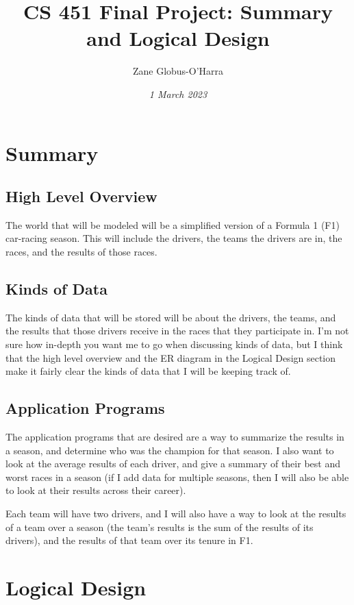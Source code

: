\documentclass{article} %
\title{CS 451 Final Project: Summary and Logical Design}
\author{Zane Globus-O'Harra}
\date{\textit{1 March 2023}}
\begin{document}
\maketitle

\section{Summary}

\subsection{High Level Overview}
The world that will be modeled will be a simplified version of a Formula
1 (F1) car-racing season. This will include the drivers, the teams the
drivers are in, the races, and the results of those races. 

\subsection{Kinds of Data}
The kinds of data that will be stored will be about the drivers, the
teams, and the results that those drivers receive in the races that they
participate in. I'm not sure how in-depth you want me to go when
discussing kinds of data, but I think that the high level overview and
the ER diagram in the Logical Design section make it fairly clear the
kinds of data that I will be keeping track of. 

\subsection{Application Programs}
The application programs that are desired are a way to summarize the
results in a season, and determine who was the champion for that season.
I also want to look at the average results of each driver, and give a
summary of their best and worst races in a season (if I add data for
multiple seasons, then I will also be able to look at their results
across their career).

Each team will have two drivers, and I will also have a way to look at
the results of a team over a season (the team's results is the sum of
the results of its drivers), and the results of that team over its
tenure in F1.


\section{Logical Design}
\end{document}
